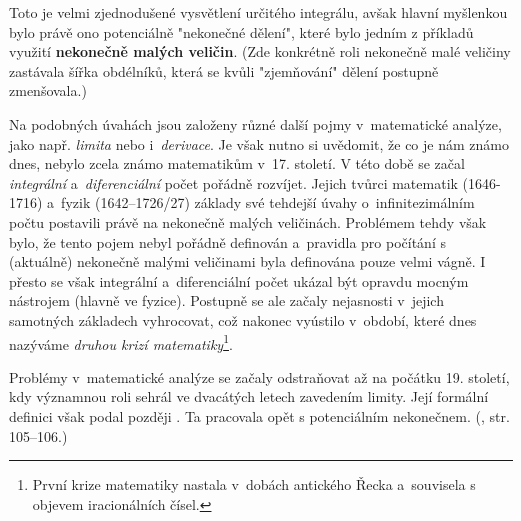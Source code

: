 Toto je velmi zjednodušené vysvětlení určitého integrálu, avšak hlavní myšlenkou bylo právě ono potenciálně "nekonečné dělení", které bylo jedním z příkladů využití \textbf{nekonečně malých veličin}. (Zde konkrétně roli nekonečně malé veličiny zastávala šířka obdélníků, která se kvůli "zjemňování" dělení postupně zmenšovala.)\par
Na podobných úvahách jsou založeny různé další pojmy v~matematické analýze, jako např. \emph{limita} nebo i~\emph{derivace}. Je však nutno si uvědomit, že co je nám známo dnes, nebylo zcela známo matematikům v~17. století. V této době se začal \emph{integrální} a~\emph{diferenciální} počet pořádně rozvíjet. Jejich tvůrci matematik  \mbox{(1646-1716)} a~fyzik  (1642--1726/27) základy své tehdejší úvahy o~infinitezimálním počtu postavili právě na nekonečně malých veličinách. Problémem tehdy však bylo, že tento pojem nebyl pořádně definován a~pravidla pro počítání s (aktuálně) nekonečně malými veličinami byla definována pouze velmi vágně. I přesto se však integrální a~diferenciální počet ukázal být opravdu mocným nástrojem (hlavně ve fyzice). Postupně se ale začaly nejasnosti v~jejich samotných základech vyhrocovat, což nakonec vyústilo v~období, které dnes nazýváme \emph{druhou krizí matematiky}\footnote{První krize matematiky nastala v~dobách antického Řecka a~souvisela s objevem iracionálních čísel.}.\par
Problémy v~matematické analýze se začaly odstraňovat až na počátku 19. století, kdy významnou roli sehrál ve dvacátých letech  zavedením limity. Její formální definici však podal později . Ta pracovala opět s potenciálním nekonečnem. (\cite{Fuchs2003}, str. 105--106.)